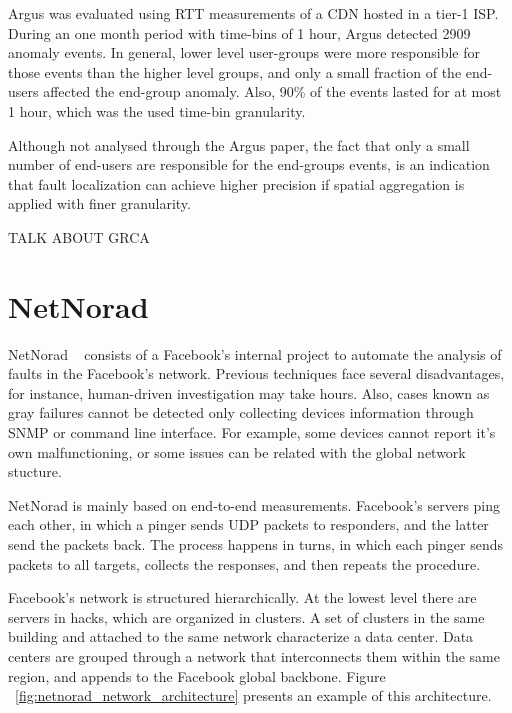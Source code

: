 Argus was evaluated using RTT measurements of a CDN hosted in a tier-1 ISP.
During an
one month period with time-bins of 1 hour, Argus detected 2909
anomaly events. In general, lower level user-groups were more responsible
for those events than the higher level groups,
and only a small fraction of the end-users affected the end-group anomaly.
Also, 90\% of the events lasted for
at most 1 hour, which was the used time-bin granularity.

Although not analysed through the Argus paper, the fact that only a small number
of end-users are responsible for the end-groups events, is an indication that
fault localization can achieve higher precision if spatial aggregation is
applied with finer granularity.

TALK ABOUT GRCA

\section{NetNorad}

NetNorad ~\cite{netnorad} consists of a Facebook's internal project to
automate the analysis of faults in the Facebook's
network. Previous techniques face several disadvantages, for instance,
human-driven investigation may take hours. Also, cases known as gray failures
cannot be detected only collecting devices information through SNMP or command
line
interface. For example, some devices cannot report it's own malfunctioning, or
some issues can be related with the global network stucture.

NetNorad is mainly based on end-to-end measurements.
Facebook's servers ping each other, in which
a pinger sends UDP packets to responders, and the latter
send the packets back. The process happens in turns, in which each pinger
sends packets to all targets, collects the responses, and then repeats
the procedure.

Facebook's network is structured hierarchically. At the
lowest level there are servers in hacks, which are organized in
clusters. A set of clusters in the same building and attached to
the same network characterize a data center. Data centers are grouped
through a network that interconnects them within the same region, and appends
to the Facebook global backbone. Figure
~\ref{fig:netnorad_network_architecture} presents an example of this
architecture.

